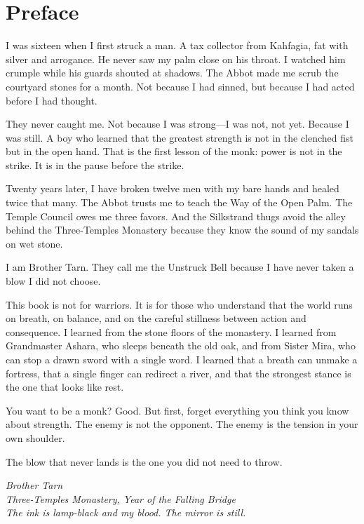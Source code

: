 \documentclass[11pt]{book}
\begin{document}


\frontmatter


\chapter*{Preface}

I was sixteen when I first struck a man. A tax collector from Kahfagia, fat with silver and arrogance. He never saw my palm close on his throat. I watched him crumple while his guards shouted at shadows. The Abbot made me scrub the courtyard stones for a month. Not because I had sinned, but because I had acted before I had thought.

They never caught me. Not because I was strong---I was not, not yet. Because I was still. A boy who learned that the greatest strength is not in the clenched fist but in the open hand. That is the first lesson of the monk: power is not in the strike. It is in the pause before the strike.

Twenty years later, I have broken twelve men with my bare hands and healed twice that many. The Abbot trusts me to teach the Way of the Open Palm. The Temple Council owes me three favors. And the Silkstrand thugs avoid the alley behind the Three-Temples Monastery because they know the sound of my sandals on wet stone.

I am Brother Tarn. They call me the Unstruck Bell because I have never taken a blow I did not choose.

This book is not for warriors. It is for those who understand that the world runs on breath, on balance, and on the careful stillness between action and consequence. I learned from the stone floors of the monastery. I learned from Grandmaster Ashara, who sleeps beneath the old oak, and from Sister Mira, who can stop a drawn sword with a single word. I learned that a breath can unmake a fortress, that a single finger can redirect a river, and that the strongest stance is the one that looks like rest.

You want to be a monk? Good. But first, forget everything you think you know about strength. The enemy is not the opponent. The enemy is the tension in your own shoulder.

The blow that never lands is the one you did not need to throw.

\textit{Brother Tarn\\
Three-Temples Monastery, Year of the Falling Bridge\\
The ink is lamp-black and my blood. The mirror is still.}
\end{document}
